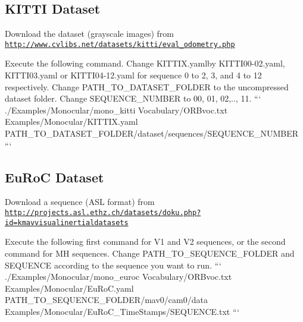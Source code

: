 \subsection*{K\-I\-T\-T\-I Dataset}


\begin{DoxyEnumerate}
\item Download the dataset (grayscale images) from \href{http://www.cvlibs.net/datasets/kitti/eval_odometry.php}{\tt http\-://www.\-cvlibs.\-net/datasets/kitti/eval\-\_\-odometry.\-php}
\item Execute the following command. Change {\ttfamily K\-I\-T\-T\-I\-X.\-yaml}by K\-I\-T\-T\-I00-\/02.\-yaml, K\-I\-T\-T\-I03.\-yaml or K\-I\-T\-T\-I04-\/12.\-yaml for sequence 0 to 2, 3, and 4 to 12 respectively. Change {\ttfamily P\-A\-T\-H\-\_\-\-T\-O\-\_\-\-D\-A\-T\-A\-S\-E\-T\-\_\-\-F\-O\-L\-D\-E\-R} to the uncompressed dataset folder. Change {\ttfamily S\-E\-Q\-U\-E\-N\-C\-E\-\_\-\-N\-U\-M\-B\-E\-R} to 00, 01, 02,.., 11. ``` ./\-Examples/\-Monocular/mono\-\_\-kitti Vocabulary/\-O\-R\-Bvoc.\-txt Examples/\-Monocular/\-K\-I\-T\-T\-I\-X.\-yaml P\-A\-T\-H\-\_\-\-T\-O\-\_\-\-D\-A\-T\-A\-S\-E\-T\-\_\-\-F\-O\-L\-D\-E\-R/dataset/sequences/\-S\-E\-Q\-U\-E\-N\-C\-E\-\_\-\-N\-U\-M\-B\-E\-R ```
\end{DoxyEnumerate}

\subsection*{Eu\-Ro\-C Dataset}


\begin{DoxyEnumerate}
\item Download a sequence (A\-S\-L format) from \href{http://projects.asl.ethz.ch/datasets/doku.php?id=kmavvisualinertialdatasets}{\tt http\-://projects.\-asl.\-ethz.\-ch/datasets/doku.\-php?id=kmavvisualinertialdatasets}
\item Execute the following first command for V1 and V2 sequences, or the second command for M\-H sequences. Change P\-A\-T\-H\-\_\-\-T\-O\-\_\-\-S\-E\-Q\-U\-E\-N\-C\-E\-\_\-\-F\-O\-L\-D\-E\-R and S\-E\-Q\-U\-E\-N\-C\-E according to the sequence you want to run. ``` ./\-Examples/\-Monocular/mono\-\_\-euroc Vocabulary/\-O\-R\-Bvoc.\-txt Examples/\-Monocular/\-Eu\-Ro\-C.\-yaml P\-A\-T\-H\-\_\-\-T\-O\-\_\-\-S\-E\-Q\-U\-E\-N\-C\-E\-\_\-\-F\-O\-L\-D\-E\-R/mav0/cam0/data Examples/\-Monocular/\-Eu\-Ro\-C\-\_\-\-Time\-Stamps/\-S\-E\-Q\-U\-E\-N\-C\-E.\-txt ```
\end{DoxyEnumerate}

